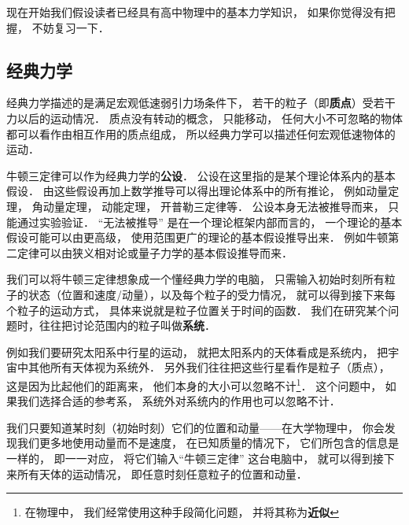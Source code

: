 
\begin{issues}
\issueTODO
\end{issues}


现在开始我们假设读者已经具有高中物理中的基本力学知识， 如果你觉得没有把握， 不妨复习一下．

\subsection{经典力学}
经典力学描述的是满足宏观低速弱引力场条件下， 若干的粒子（即\textbf{质点}）受若干力以后的运动情况． 质点没有转动的概念， 只能移动， 任何大小不可忽略的物体都可以看作由相互作用的质点组成， 所以经典力学可以描述任何宏观低速物体的运动．

牛顿三定律可以作为经典力学的\textbf{公设}． 公设在这里指的是某个理论体系内的基本假设． 由这些假设再加上数学推导可以得出理论体系中的所有推论， 例如动量定理， 角动量定理， 动能定理， 开普勒三定律等． 公设本身无法被推导而来， 只能通过实验验证． “无法被推导” 是在一个理论框架内部而言的， 一个理论的基本假设可能可以由更高级， 使用范围更广的理论的基本假设推导出来． 例如牛顿第二定律可以由狭义相对论或量子力学的基本假设推导而来．

我们可以将牛顿三定律想象成一个懂经典力学的电脑， 只需输入初始时刻所有粒子的状态（位置和速度/动量），以及每个粒子的受力情况， 就可以得到接下来每个粒子的运动方式， 具体来说就是粒子位置关于时间的函数． 我们在研究某个问题时，往往把讨论范围内的粒子叫做\textbf{系统}．

例如我们要研究太阳系中行星的运动， 就把太阳系内的天体看成是系统内， 把宇宙中其他所有天体视为系统外． 另外我们往往把这些行星看作是粒子（质点）， 这是因为比起他们的距离来， 他们本身的大小可以忽略不计\footnote{在物理中， 我们经常使用这种手段简化问题， 并将其称为\textbf{近似}}． 这个问题中， 如果我们选择合适的参考系， 系统外对系统内的作用也可以忽略不计．

我们只要知道某时刻（初始时刻）它们的位置和动量——在大学物理中， 你会发现我们更多地使用动量而不是速度， 在已知质量的情况下， 它们所包含的信息是一样的， 即一一对应， 将它们输入“牛顿三定律” 这台电脑中， 就可以得到接下来所有天体的运动情况， 即任意时刻任意粒子的位置和动量．

